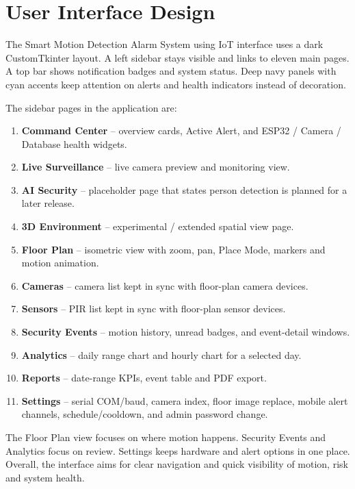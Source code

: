 \documentclass[12pt,a4paper]{report}
\begin{document}
\section{User Interface Design}

The Smart Motion Detection Alarm System using IoT interface uses a dark CustomTkinter layout. A left sidebar stays visible and links to eleven main pages. A top bar shows notification badges and system status. Deep navy panels with cyan accents keep attention on alerts and health indicators instead of decoration.

The sidebar pages in the application are:

\begin{enumerate}
\item \textbf{Command Center} -- overview cards, Active Alert, and ESP32 / Camera / Database health widgets.
\item \textbf{Live Surveillance} -- live camera preview and monitoring view.
\item \textbf{AI Security} -- placeholder page that states person detection is planned for a later release.
\item \textbf{3D Environment} -- experimental / extended spatial view page.
\item \textbf{Floor Plan} -- isometric view with zoom, pan, Place Mode, markers and motion animation.
\item \textbf{Cameras} -- camera list kept in sync with floor-plan camera devices.
\item \textbf{Sensors} -- PIR list kept in sync with floor-plan sensor devices.
\item \textbf{Security Events} -- motion history, unread badges, and event-detail windows.
\item \textbf{Analytics} -- daily range chart and hourly chart for a selected day.
\item \textbf{Reports} -- date-range KPIs, event table and PDF export.
\item \textbf{Settings} -- serial COM/baud, camera index, floor image replace, mobile alert channels, schedule/cooldown, and admin password change.
\end{enumerate}

The Floor Plan view focuses on where motion happens. Security Events and Analytics focus on review. Settings keeps hardware and alert options in one place. Overall, the interface aims for clear navigation and quick visibility of motion, risk and system health.

\end{document}

